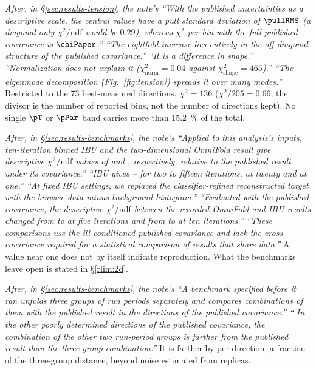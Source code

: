 \emph{After, in \S\ref{sec:results-tension}, the note's ``With the published uncertainties as a descriptive scale, the central values have a pull standard deviation of $\pullRMS$ (a diagonal-only $\chi^{2}/\mathrm{ndf}$ would be $0.29$), whereas $\chi^{2}$ per bin with the full published covariance is $\chiPaper$.'' ``The eightfold increase lies entirely in the off-diagonal structure of the published covariance.'' ``It is a difference in \emph{shape}.'' ``Normalization does not explain it ($\chi^{2}_{\mathrm{norm}}=0.04$ against $\chi^{2}_{\mathrm{shape}}=465$).'' ``The eigenmode decomposition (Fig.~\ref{fig:tension}) spreads it over many modes.''}
Restricted to the 73 best-measured directions, $\chi^{2}=136$ ($\chi^{2}/205=0.66$; the divisor is the number of reported bins, not the number of directions kept). No single $\pT$ or $\pPar$ band carries more than \SI{15.2}{\percent} of the total.

\emph{After, in \S\ref{sec:results-benchmarks}, the note's ``Applied to this analysis's inputs, ten-iteration binned IBU and the two-dimensional OmniFold result give descriptive $\chi^{2}/\mathrm{ndf}$ values of  and , respectively, relative to the published result under its covariance.'' ``IBU gives -- for two to fifteen iterations,  at twenty and  at one.'' ``At fixed IBU settings, we replaced the classifier-refined reconstructed target with the binwise data-minus-background histogram.'' ``Evaluated with the published covariance, the descriptive $\chi^{2}/\mathrm{ndf}$ between the recorded OmniFold and IBU results changed from  to  at five iterations and from  to  at ten iterations.'' ``These comparisons use the ill-conditioned published covariance and lack the cross-covariance required for a statistical comparison of results that share data.''}
A value near one does not by itself indicate reproduction. What the benchmarks leave open is stated in \S\ref{rlim:2d}.

\emph{After, in \S\ref{sec:results-benchmarks}, the note's ``A benchmark specified before it ran unfolds three groups of run periods separately and compares combinations of them with the published result in the directions of the published covariance.'' `` In the other  poorly determined directions of the published covariance, the combination of the other two run-period groups is farther from the published result than the three-group combination.''}
It is farther by  per direction, a fraction  of the three-group distance, beyond noise estimated from  replicas.

